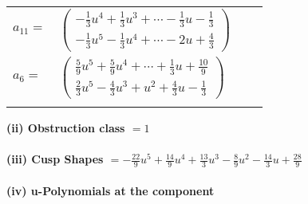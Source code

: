 \documentclass[1p]{elsarticle_modified}
\theoremstyle{definition}
\begin{document}
\begin{tabular}{m{7pt} m{180pt} m{7pt} m{180pt} }
\flushright $a_{11}=$&$\begin{pmatrix}-\frac{1}{3} u^4+\frac{1}{3} u^3+\cdots-\frac{1}{3} u-\frac{1}{3}\\-\frac{1}{3} u^5-\frac{1}{3} u^4+\cdots-2 u+\frac{4}{3}\end{pmatrix}$ \\
\flushright $a_{6}=$&$\begin{pmatrix}\frac{5}{9} u^5+\frac{5}{9} u^4+\cdots+\frac{1}{3} u+\frac{10}{9}\\\frac{2}{3} u^5-\frac{4}{3} u^3+u^2+\frac{4}{3} u-\frac{1}{3}\end{pmatrix}$\\&\end{tabular}
\flushleft \textbf{(ii) Obstruction class $= 1$}\\~\\
\flushleft \textbf{(iii) Cusp Shapes $= -\frac{22}{9} u^5+\frac{14}{9} u^4+\frac{13}{3} u^3-\frac{8}{9} u^2-\frac{14}{3} u+\frac{28}{9}$}\\~\\
\newpage\renewcommand{\arraystretch}{1}
\flushleft \textbf{(iv) u-Polynomials at the component}\newline \\
\end{document}
